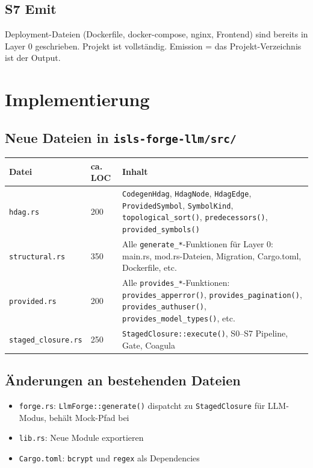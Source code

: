 \documentclass[11pt,a4paper]{article}
\begin{document}
\subsection{S7 Emit}

Deployment-Dateien (Dockerfile, docker-compose, nginx, Frontend)
sind bereits in Layer 0 geschrieben. Projekt ist vollständig.
Emission = das Projekt-Verzeichnis ist der Output.

\section{Implementierung}

\subsection{Neue Dateien in \texttt{isls-forge-llm/src/}}

\begin{center}
\begin{tabular}{llp{7cm}}
\toprule
\textbf{Datei} & \textbf{ca. LOC} & \textbf{Inhalt} \\
\midrule
\texttt{hdag.rs} & 200 & \texttt{CodegenHdag}, \texttt{HdagNode}, \texttt{HdagEdge},
  \texttt{ProvidedSymbol}, \texttt{SymbolKind}, \texttt{topological\_sort()},
  \texttt{predecessors()}, \texttt{provided\_symbols()} \\
\texttt{structural.rs} & 350 & Alle \texttt{generate\_*}-Funktionen für Layer 0:
  main.rs, mod.rs-Dateien, Migration, Cargo.toml, Dockerfile, etc. \\
\texttt{provided.rs} & 200 & Alle \texttt{provides\_*}-Funktionen:
  \texttt{provides\_apperror()}, \texttt{provides\_pagination()},
  \texttt{provides\_authuser()}, \texttt{provides\_model\_types()}, etc. \\
\texttt{staged\_closure.rs} & 250 & \texttt{StagedClosure::execute()},
  S0--S7 Pipeline, Gate, Coagula \\
\bottomrule
\end{tabular}
\end{center}

\subsection{Änderungen an bestehenden Dateien}

\begin{itemize}[nosep]
\item \texttt{forge.rs}: \texttt{LlmForge::generate()} dispatcht zu
  \texttt{StagedClosure} für LLM-Modus, behält Mock-Pfad bei
\item \texttt{lib.rs}: Neue Module exportieren
\item \texttt{Cargo.toml}: \texttt{bcrypt} und \texttt{regex} als Dependencies
\end{itemize}
\end{document}
